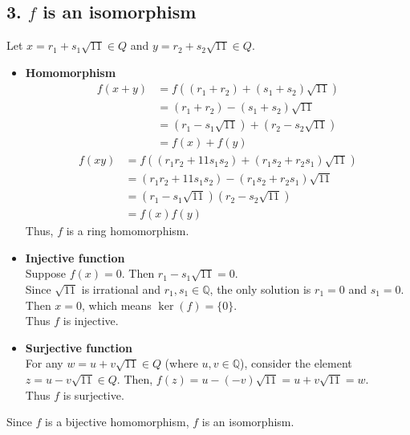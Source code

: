\documentclass[11pt, a4paper]{article}
\begin{document}
\subsection*{3. $f$ is an isomorphism}
Let $x = r_1 + s_1\sqrt{11} \in Q$ and $y = r_2 + s_2\sqrt{11} \in Q$.

\begin{itemize}
    \item \textbf{Homomorphism}
    \begin{align*}
        f(x+y) &= f((r_1+r_2) + (s_1+s_2)\sqrt{11}) \\
        &= (r_1+r_2) - (s_1+s_2)\sqrt{11} \\
        &= (r_1-s_1\sqrt{11}) + (r_2-s_2\sqrt{11}) \\
        &= f(x) + f(y)
    \end{align*}
    \begin{align*}
        f(xy) &= f((r_1r_2+11s_1s_2) + (r_1s_2+r_2s_1)\sqrt{11}) \\
        &= (r_1r_2+11s_1s_2) - (r_1s_2+r_2s_1)\sqrt{11} \\
        &= (r_1-s_1\sqrt{11})(r_2-s_2\sqrt{11}) \\
        &= f(x)f(y)
    \end{align*}
    Thus, $f$ is a ring homomorphism.
    
    \item \textbf{Injective function}\\
    Suppose $f(x) = 0$. Then $r_1 - s_1\sqrt{11} = 0$.\\
    Since $\sqrt{11}$ is irrational and $r_1, s_1 \in \mathbb{Q}$, the only solution is $r_1=0$ and $s_1=0$.\\
    Then $x = 0$, which means $\ker(f) = \{0\}$.\\
    Thus $f$ is injective.
    
    \item \textbf{Surjective function}\\
    For any $w = u + v\sqrt{11} \in Q$ (where $u,v \in \mathbb{Q}$), consider the element $z = u - v\sqrt{11} \in Q$.
    Then, $f(z) = u - (-v)\sqrt{11} = u + v\sqrt{11} = w$.\\
    Thus $f$ is surjective.
\end{itemize}
Since $f$ is a bijective homomorphism, $f$ is an isomorphism.
\end{document}
